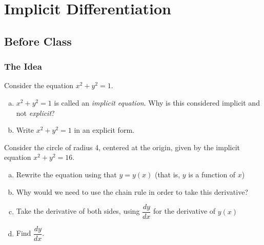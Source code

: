 \documentclass[notes]{subfiles}
\begin{document}
	\fancyhead[LO,RE]{\bfseries \currentname}
	\fancyfoot[C]{{}}
	\fancyfoot[RO,LE]{\large \thepage}	%
	
\section*{Implicit Differentiation}\label{cs26}
	\subsection*{Before Class}
	\subsubsection*{The Idea}
		\begin{ex}
			Consider the equation $x^2 + y^2 = 1$.
			\begin{enumerate}[(a)]
				\item $x^2 + y^2 = 1$ is called an \emph{implicit equation}.  Why is this considered implicit and not \emph{explicit}?
					
				\item Write $x^2 + y^2 = 1$ in an explicit form.
					
			\end{enumerate}
		\end{ex}
		\begin{ex}
			Consider the circle of radius 4, centered at the origin, given by the implicit equation $x^2 + y^2 = 16$.
			\begin{enumerate}[(a)]
				\item Rewrite the equation using that $y = y(x)$ (that is, $y$ is a function of $x$)
					\vs{.5}
					
				\item Why would we need to use the chain rule in order to take this derivative?  
					\vs{.5}
					
				\item Take the derivative of both sides, using $\dfrac{dy}{dx}$ for the derivative of $y(x)$
					\vs{1}
					
				\item Find $\dfrac{dy}{dx}$.
					\vs{1}
			\end{enumerate}
		\end{ex}
			\newpage
		
\end{document}
